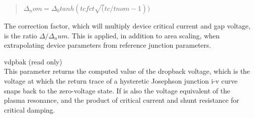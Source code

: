 \begin{description}
\begin{quote}
$\Delta_nom = \Delta_0 tanh(tcfct\sqrt(tc/tnom-1))$
\end{quote}

The correction factor, which will multiply device critical current and
gap voltage, is the ratio $\Delta/\Delta_num$.  This is applied, in
addition to area scaling, when extrapolating device parameters from
reference junction parameters.

\item{\vt vdpbak} (read only)\\
This parameter returns the computed value of the dropback voltage,
which is the voltage at which the return trace of a hysteretic
Josephson junction i-v curve snaps back to the zero-voltage state.  If
is also the voltage equivalent of the plasma resonance, and the
product of critical current and shunt resistance for critical damping.
\end{description}

